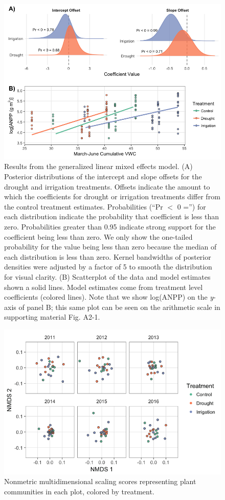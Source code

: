 \documentclass[fleqn,10pt,lineno]{wlpeerj} %
\begin{document}
\begin{figure}[!ht]
  \centering
      \includegraphics[width=5in]{../figures/glmm_main_results.png}
  \caption{Results from the generalized linear mixed effects model. (A) Posterior distributions of the intercept and slope offsets for the drought and irrigation treatments. Offsets indicate the amount to which the coefficients for drought or irrigation treatments differ from the control treatment estimates. Probabilities (``Pr $<$ 0 ='') for each distribution indicate the probability that coefficient is less than zero. Probabilities greater than 0.95 indicate strong support for the coefficient being less than zero. We only show the one-tailed probability for the value being less than zero because the median of each distribution is less than zero. Kernel bandwidths of posterior densities were adjusted by a factor of 5 to smooth the distribution for visual clarity. (B) Scatterplot of the data and model estimates shown a solid lines. Model estimates come from treatment level coefficients (colored lines). Note that we show log(ANPP) on the \emph{y}-axis of panel B; this same plot can be seen on the arithmetic scale in supporting material Fig. A2-1.}
\end{figure}

\newpage{}

\begin{figure}[!ht]
  \centering
      \includegraphics[width=5in]{../figures/sppcomp_bray_all.png}
  \caption{Nonmetric multidimensional scaling scores representing plant communities in each plot, colored by treatment.}
\end{figure}

\newpage{}



\end{document}
